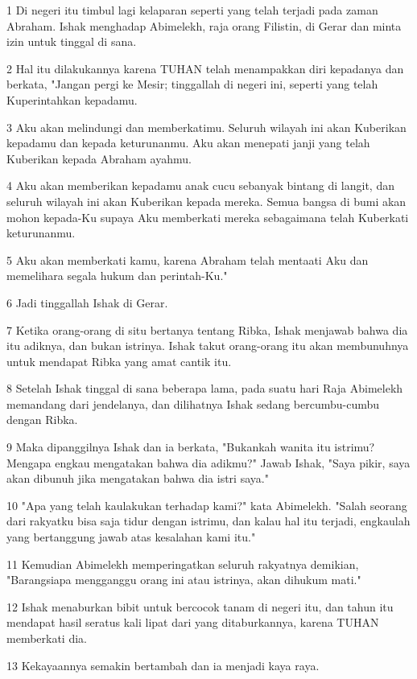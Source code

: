\par 1 Di negeri itu timbul lagi kelaparan seperti yang telah terjadi pada zaman Abraham. Ishak menghadap Abimelekh, raja orang Filistin, di Gerar dan minta izin untuk tinggal di sana.
\par 2 Hal itu dilakukannya karena TUHAN telah menampakkan diri kepadanya dan berkata, "Jangan pergi ke Mesir; tinggallah di negeri ini, seperti yang telah Kuperintahkan kepadamu.
\par 3 Aku akan melindungi dan memberkatimu. Seluruh wilayah ini akan Kuberikan kepadamu dan kepada keturunanmu. Aku akan menepati janji yang telah Kuberikan kepada Abraham ayahmu.
\par 4 Aku akan memberikan kepadamu anak cucu sebanyak bintang di langit, dan seluruh wilayah ini akan Kuberikan kepada mereka. Semua bangsa di bumi akan mohon kepada-Ku supaya Aku memberkati mereka sebagaimana telah Kuberkati keturunanmu.
\par 5 Aku akan memberkati kamu, karena Abraham telah mentaati Aku dan memelihara segala hukum dan perintah-Ku."
\par 6 Jadi tinggallah Ishak di Gerar.
\par 7 Ketika orang-orang di situ bertanya tentang Ribka, Ishak menjawab bahwa dia itu adiknya, dan bukan istrinya. Ishak takut orang-orang itu akan membunuhnya untuk mendapat Ribka yang amat cantik itu.
\par 8 Setelah Ishak tinggal di sana beberapa lama, pada suatu hari Raja Abimelekh memandang dari jendelanya, dan dilihatnya Ishak sedang bercumbu-cumbu dengan Ribka.
\par 9 Maka dipanggilnya Ishak dan ia berkata, "Bukankah wanita itu istrimu? Mengapa engkau mengatakan bahwa dia adikmu?" Jawab Ishak, "Saya pikir, saya akan dibunuh jika mengatakan bahwa dia istri saya."
\par 10 "Apa yang telah kaulakukan terhadap kami?" kata Abimelekh. "Salah seorang dari rakyatku bisa saja tidur dengan istrimu, dan kalau hal itu terjadi, engkaulah yang bertanggung jawab atas kesalahan kami itu."
\par 11 Kemudian Abimelekh memperingatkan seluruh rakyatnya demikian, "Barangsiapa mengganggu orang ini atau istrinya, akan dihukum mati."
\par 12 Ishak menaburkan bibit untuk bercocok tanam di negeri itu, dan tahun itu mendapat hasil seratus kali lipat dari yang ditaburkannya, karena TUHAN memberkati dia.
\par 13 Kekayaannya semakin bertambah dan ia menjadi kaya raya.

